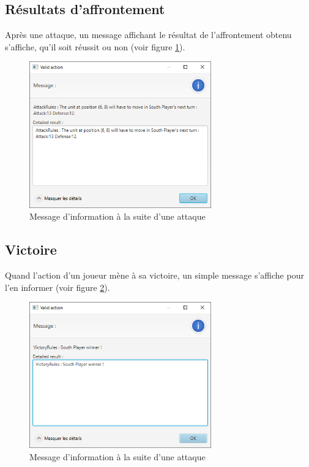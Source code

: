 \documentclass[a4paper]{report}
\begin{document}
\subsection*{Résultats d'affrontement}
Après une attaque, un message affichant le résultat de l'affrontement obtenu s'affiche, qu'il soit réussit ou non (voir figure \ref{fig:logAttack}).
\begin{figure}[!h]
\centering
\includegraphics[width=0.7\textwidth]{interface/logAttack}
\caption{Message d'information à la suite d'une attaque}\label{fig:logAttack}
\end{figure}

\subsection*{Victoire}
Quand l'action d'un joueur mène à sa victoire, un simple message s'affiche pour l'en informer (voir figure \ref{fig:logVictory}).
\begin{figure}[!h]
\centering
\includegraphics[width=0.7\textwidth]{interface/logVictory}
\caption{Message d'information à la suite d'une attaque}\label{fig:logVictory}
\end{figure}
\end{document}
